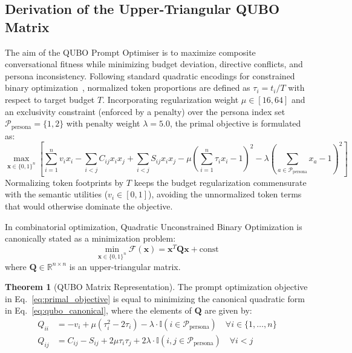 \documentclass[review,12pt,times,authoryear]{elsarticle}
\theoremstyle{definition}
\newtheorem{theorem}{Theorem}[section]
\begin{document}
\subsection{Derivation of the Upper-Triangular QUBO Matrix}
The aim of the QUBO Prompt Optimiser is to maximize composite conversational fitness while minimizing budget deviation, directive conflicts, and persona inconsistency. Following standard quadratic encodings for constrained binary optimization~\citep{Glover2019}, normalized token proportions are defined as $\tau_i = t_i / T$ with respect to target budget $T$. Incorporating regularization weight $\mu \in [16, 64]$ and an exclusivity constraint (enforced by a penalty) over the persona index set $\mathcal{P}_{\mathrm{persona}} = \{1, 2\}$ with penalty weight $\lambda = 5.0$, the primal objective is formulated as:
\begin{equation}
  \max_{\bm{x} \in \{0, 1\}^n} \left[ \sum_{i=1}^n v_i x_i - \sum_{i < j} C_{ij} x_i x_j + \sum_{i < j} S_{ij} x_i x_j - \mu \left(\sum_{i=1}^n \tau_i x_i - 1\right)^2 - \lambda \left(\sum_{a \in \mathcal{P}_{\mathrm{persona}}} x_a - 1\right)^2 \right]
  \label{eq:primal_objective}
\end{equation}
Normalizing token footprints by $T$ keeps the budget regularization commensurate with the semantic utilities ($v_i \in [0, 1]$), avoiding the unnormalized token terms that would otherwise dominate the objective.

In combinatorial optimization, Quadratic Unconstrained Binary Optimization is canonically stated as a minimization problem:
\begin{equation}
  \min_{\bm{x} \in \{0, 1\}^n} \mathcal{F}(\bm{x}) = \bm{x}^T \mathbf{Q} \bm{x} + \mathrm{const}
  \label{eq:qubo_canonical}
\end{equation}
where $\mathbf{Q} \in \mathbb{R}^{n \times n}$ is an upper-triangular matrix.

\begin{theorem}[QUBO Matrix Representation]
The prompt optimization objective in Eq.~\eqref{eq:primal_objective} is equal to minimizing the canonical quadratic form in Eq.~\eqref{eq:qubo_canonical}, where the elements of $\mathbf{Q}$ are given by:
\begin{align}
  Q_{ii} &= -v_i + \mu \left(\tau_i^2 - 2 \tau_i\right) - \lambda \cdot \mathbb{I}(i \in \mathcal{P}_{\mathrm{persona}}) \quad \forall i \in \{1, \ldots, n\} \label{eq:q_diag} \\
  Q_{ij} &= C_{ij} - S_{ij} + 2 \mu \tau_i \tau_j + 2\lambda \cdot \mathbb{I}(i, j \in \mathcal{P}_{\mathrm{persona}}) \quad \forall i < j \label{eq:q_offdiag}
\end{align}
\end{theorem}
\end{document}

